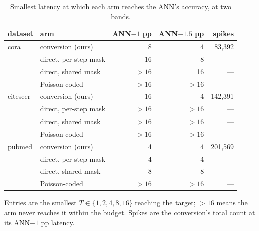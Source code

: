 \begin{table}[t]
\centering
\small
\caption{Smallest latency at which each arm reaches the ANN's accuracy, at two bands.}
\label{tab:iso}
\begin{tabular}{llrrr}
\toprule
dataset & arm & ANN$-1$ pp & ANN$-1.5$ pp & spikes \\
\midrule
cora & conversion (ours) & 8 & 4 & 83,392 \\
 & direct, per-step mask & 16 & 8 & --- \\
 & direct, shared mask & $>16$ & 16 & --- \\
 & Poisson-coded & $>16$ & $>16$ & --- \\
citeseer & conversion (ours) & 16 & 4 & 142,391 \\
 & direct, per-step mask & $>16$ & $>16$ & --- \\
 & direct, shared mask & $>16$ & $>16$ & --- \\
 & Poisson-coded & $>16$ & $>16$ & --- \\
pubmed & conversion (ours) & 4 & 4 & 201,569 \\
 & direct, per-step mask & 4 & 4 & --- \\
 & direct, shared mask & 8 & 8 & --- \\
 & Poisson-coded & $>16$ & $>16$ & --- \\
\bottomrule
\end{tabular}
\par\vspace{2pt}\footnotesize Entries are the smallest $T\in\{1,2,4,8,16\}$ reaching the target; $>16$ means the arm never reaches it within the budget. Spikes are the conversion's total count at its ANN$-1$ pp latency.
\end{table}
